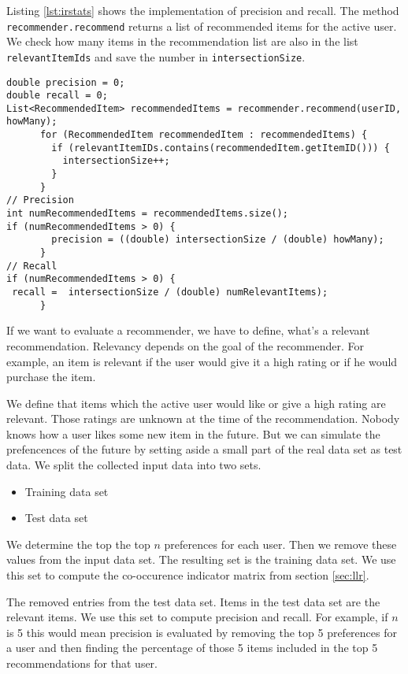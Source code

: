 Listing \ref{lst:irstats} shows the implementation of precision and recall. 
The method \verb|recommender.recommend| returns a list of recommended items for the active user. We check how many items in the recommendation list are also in the list \verb|relevantItemIds| and save the number in \verb|intersectionSize|. 

\begin{lstlisting}[caption=Implementation of precision and recall,label=lst:irstats]
double precision = 0;
double recall = 0;
List<RecommendedItem> recommendedItems = recommender.recommend(userID, howMany);
      for (RecommendedItem recommendedItem : recommendedItems) {
        if (relevantItemIDs.contains(recommendedItem.getItemID())) {
          intersectionSize++;
        }
      }
// Precision
int numRecommendedItems = recommendedItems.size();
if (numRecommendedItems > 0) {
        precision = ((double) intersectionSize / (double) howMany);
      }
// Recall
if (numRecommendedItems > 0) {
 recall =  intersectionSize / (double) numRelevantItems);
      }
\end{lstlisting}

If we want to evaluate a recommender, we have to define, what's a relevant recommendation. Relevancy depends on the goal of the recommender. For example, an item is relevant if the user would give it a high rating or if he would purchase the item.

We define that items which the active user would like or give a high rating are relevant. 
Those ratings are unknown at the time of the recommendation. Nobody knows how a user likes some new item in the future.
But we can simulate the prefencences of the future by setting aside a small part of the real data set as test data. We split the collected input data into two sets.
\begin{itemize}
\item Training data set
\item Test data set
\end{itemize}

We determine the top the top $n$ preferences for each user. Then we remove these values from the input data set. The resulting set is the training data set. We use this set to compute the co-occurence indicator matrix from section \ref{sec:llr}.

The removed entries from the test data set. Items in the test data set are the relevant items. We use this set to compute precision and recall.
For example, if $n$ is 5 this would mean precision is evaluated by removing the top 5 preferences for a user and then finding the percentage of those 5 items included in the top 5 recommendations for that user. 

